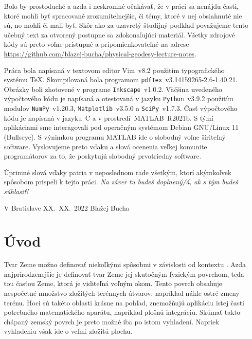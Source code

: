 \documentclass[a4paper, 12pt]{book}
\begin{document}
Bolo by prostoduché a azda i neskromné očakávať, že v práci sa nenájdu časti, 
ktoré mohli byť spracované zrozumiteľnejšie, či témy, ktoré v nej obsiahnuté 
nie sú, no mohli či mali byť.  Skôr ako za uzavretý študijný podklad považujeme 
tento učebný text za otvorený postupne sa zdokonaľujúci materiál.  Všetky 
zdrojové kódy sú preto voľne prístupné a pripomienkovateľné na adrese 
\url{https://github.com/blazej-bucha/physical-geodesy-lecture-notes}.

Práca bola napísaná v textovom editor Vim~v8.2 použitím typografického systému 
\TeX.  Skompilovaná bola programom \texttt{pdfTex}~v3.14159265-2.6-1.40.21.  
Obrázky boli zhotovené v programe \texttt{Inkscape}~v1.0.2.  Väčšina uvedeného 
výpočtového kódu je napísaná a otestovaná v jazyku \texttt{Python}~v3.9.2 
použitím modulov \texttt{NumPy}~v1.20.3, \texttt{Matplotlib}~v3.5.0 
a \texttt{SciPy}~v1.7.3.  Časť výpočtového kódu je napísaná v jazyku~C 
a v prostredí~MATLAB~R2021b.  S tými aplikáciami sme interagovali pod operačným 
systémom Debian GNU/Linux 11 (Bullseye).  S výnimkou programu MATLAB ide 
o slobodný voľne šíriteľný software.  Vyslovujeme preto vďaku a slová ocenenia 
veľkej komunite programátorov za to, že poskytujú slobodný prvotriedny 
software.

Úprimné slová vďaky patria v neposlednom rade všetkým, ktorí akýmkoľvek 
spôsobom prispeli k tejto práci. \emph{Na záver tu budeš doplnený/á, ak s tým 
budeš súhlasiť!}


\vspace{4ex}

\noindent V Bratislave XX.~XX.~2022 \hfill Blažej Bucha





\chapter{Úvod}

Tvar Zeme možno definovať niekoľkými spôsobmi v závislosti od kontextu 
\citep{MoritzTheFigureOfTheEarth}.  Azda najprirodzenejšie je definovať tvar 
Zeme jej skutočným fyzickým povrchom, teda tou časťou Zeme, ktorá je viditeľná 
voľným okom.  Tento povrch obsahuje nespočetné množstvo zložitých terénnych 
útvarov, napríklad náhle ostré zmeny terénu.  Hoci sú takéto oblasti krásne na 
pohľad, znemožňujú aplikáciu istej časti potrebného matematického aparátu, 
napríklad plošnú integráciu.  Skúmať takto chápaný zemský povrch je preto možné 
iba po istom vyhladení.  Napriek vyhladeniu však ide o veľmi zložitú plochu.
\end{document}

